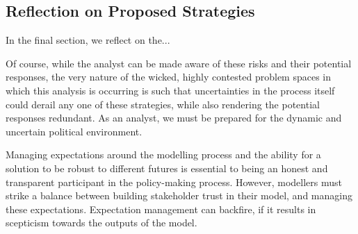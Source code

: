 \subsection{Reflection on Proposed Strategies}

In the final section, we reflect on the...


Of course, while the analyst can be made aware of these risks and their potential responses, the very nature of the wicked, highly contested problem spaces in which this analysis is occurring is such that uncertainties in the process itself could derail any one of these strategies, while also rendering the potential responses redundant. As an analyst, we must be prepared for the dynamic and uncertain political environment. 

Managing expectations around the modelling process and the ability for a solution to be robust to different futures is essential to being an honest and transparent participant in the policy-making process. However, modellers must strike a balance between building stakeholder trust in their model, and managing these expectations. Expectation management can backfire, if it results in scepticism towards the outputs of the model.

